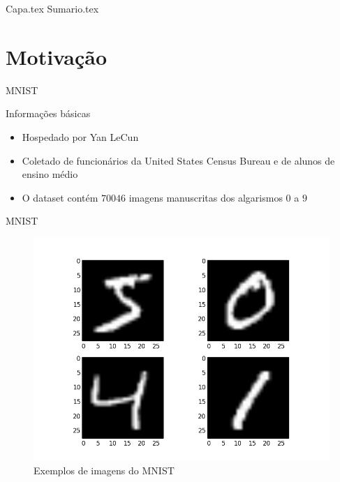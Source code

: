 \documentclass[xcolor=dvipsnames]{beamer}
\begin{document}
    {Capa.tex}
    {Sumario.tex}
    \section{Motivação}
        \begin{frame}{MNIST}
            \begin{block}{Informações básicas}
                \begin{itemize}
                    \item Hospedado por Yan LeCun
                    \item Coletado de funcionários da United States Census Bureau e de alunos de ensino médio
                    \item O dataset contém $70046$ imagens manuscritas dos algarismos $0$ a $9$
                \end{itemize}
            \end{block}  
        \end{frame}
        \begin{frame}{MNIST}
            \begin{figure}
                \centering
                \includegraphics[scale=0.4]{Imagens/mnist.png}
                \caption{Exemplos de imagens do MNIST}
                \label{fig:mnist}
            \end{figure}
        \end{frame}
\end{document}
